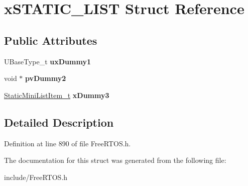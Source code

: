 \hypertarget{structxSTATIC__LIST}{}\section{x\+S\+T\+A\+T\+I\+C\+\_\+\+L\+I\+ST Struct Reference}
\label{structxSTATIC__LIST}
\subsection*{Public Attributes}
\begin{DoxyCompactItemize}
\item 
\mbox{\label{structxSTATIC__LIST_a6d7f720dc21e3a676b885b72a945fea7}} 
U\+Base\+Type\+\_\+t {\bfseries ux\+Dummy1}
\item 
\mbox{\label{structxSTATIC__LIST_a681e588716be5f49fe8e9eb73e8f280e}} 
void $\ast$ {\bfseries pv\+Dummy2}
\item 
\mbox{\label{structxSTATIC__LIST_a232545ebb5629617e0ee6ba286e37788}} 
\mbox{\hyperlink{structxSTATIC__MINI__LIST__ITEM}{Static\+Mini\+List\+Item\+\_\+t}} {\bfseries x\+Dummy3}
\end{DoxyCompactItemize}


\subsection{Detailed Description}


Definition at line 890 of file Free\+R\+T\+O\+S.\+h.



The documentation for this struct was generated from the following file\+:\begin{DoxyCompactItemize}
\item 
include/Free\+R\+T\+O\+S.\+h\end{DoxyCompactItemize}
